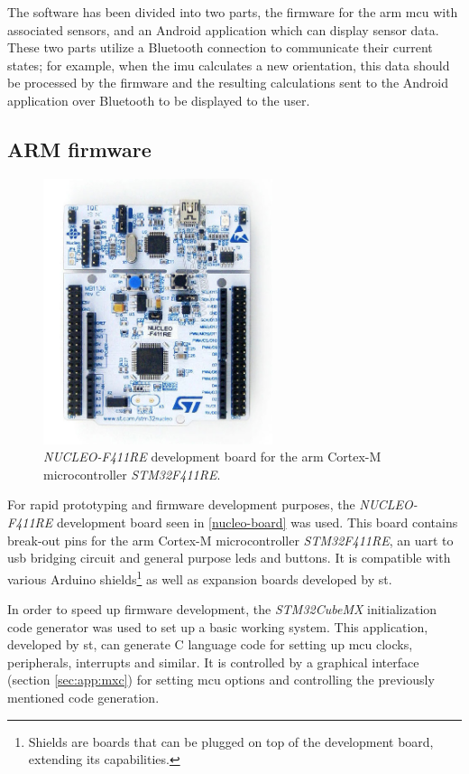 The software has been divided into two parts, the firmware for the \gls{arm} \gls{mcu} with associated sensors, and an Android application which can display sensor data. These two parts utilize a Bluetooth connection to communicate their current states; for example, when the \gls{imu} calculates a new orientation, this data should be processed by the firmware and the resulting calculations sent to the Android application over Bluetooth to be displayed to the user.

\subsection{ARM firmware}
\begin{figure}[H]
\centering
\includegraphics[width=0.6\textwidth]{Figures/stm32nucleo.jpg}
\caption{\emph{NUCLEO-F411RE} development board for the \gls{arm} Cortex-M microcontroller \emph{STM32F411RE}.}
\label{nucleo-board}
\end{figure}

For rapid prototyping and firmware development purposes, the \emph{NUCLEO-F411RE} development board seen in \autoref{nucleo-board} was used. This board contains break-out pins for the \gls{arm} Cortex-M microcontroller \emph{STM32F411RE}, an \gls{uart} to \gls{usb} bridging circuit and general purpose \gls{led}s and buttons. It is compatible with various Arduino shields\footnote{Shields are boards that can be plugged on top of the development board, extending its capabilities.} as well as expansion boards developed by \gls{st}.

In order to speed up firmware development, the \emph{STM32CubeMX}\cite{stm32cubemx} initialization code generator was used to set up a basic working system. This application, developed by \gls{st}, can generate C language code for setting up \gls{mcu} clocks, peripherals, interrupts and similar. It is controlled by a graphical interface (section \ref{sec:app:mxc}) for setting \gls{mcu} options and controlling the previously mentioned code generation.

